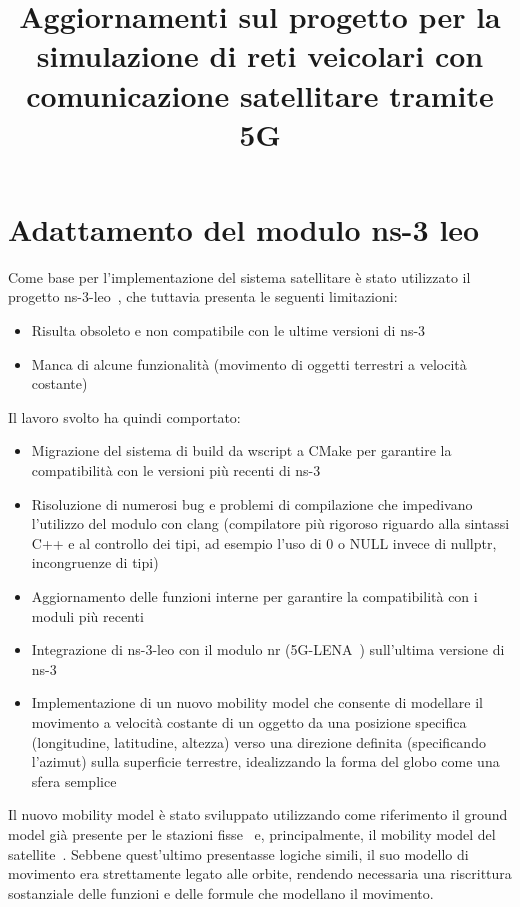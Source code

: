 \documentclass[12pt,a4paper]{article}
\title{Aggiornamenti sul progetto per la simulazione di reti veicolari con comunicazione satellitare tramite 5G}
\author{}
\date{}
\providecommand{\tightlist}{%
  \setlength{\itemsep}{0pt}\setlength{\parskip}{0pt}}
\begin{document}
\maketitle

\section{Adattamento del modulo ns-3 leo}\label{adattamento-del-modulo-ns-3-leo}

Come base per l'implementazione del sistema satellitare è stato utilizzato il progetto ns-3-leo~\cite{ns3leo}\cite{ns3leoarticle}, che tuttavia presenta le seguenti limitazioni:

\begin{itemize}
\tightlist
\item
  Risulta obsoleto e non compatibile con le ultime versioni di ns-3
\item
  Manca di alcune funzionalità (movimento di oggetti terrestri a velocità costante)
\end{itemize}

Il lavoro svolto ha quindi comportato:

\begin{itemize}
\item
  Migrazione del sistema di build da wscript a CMake per garantire la compatibilità con le versioni più recenti di ns-3
\item
  Risoluzione di numerosi bug e problemi di compilazione che impedivano l'utilizzo del modulo con clang (compilatore più rigoroso riguardo alla sintassi C++ e al controllo dei tipi, ad esempio l'uso di 0 o NULL invece di nullptr, incongruenze di tipi)
\item
  Aggiornamento delle funzioni interne per garantire la compatibilità con i moduli più recenti
\item
  Integrazione di ns-3-leo con il modulo nr (5G-LENA~\cite{5glena}) sull'ultima versione di ns-3
\item
  Implementazione di un nuovo mobility model che consente di modellare il movimento a velocità costante di un oggetto da una posizione specifica (longitudine, latitudine, altezza) verso una direzione definita (specificando l'azimut) sulla superficie terrestre, idealizzando la forma del globo come una sfera semplice
\end{itemize}

Il nuovo mobility model è stato sviluppato utilizzando come riferimento il ground model già presente per le stazioni fisse~\cite{ns3leo_groundhelper} e, principalmente, il mobility model del satellite~\cite{ns3leo_mobility}. Sebbene quest'ultimo presentasse logiche simili, il suo modello di movimento era strettamente legato alle orbite, rendendo necessaria una riscrittura sostanziale delle funzioni e delle formule che modellano il movimento.
\end{document}
